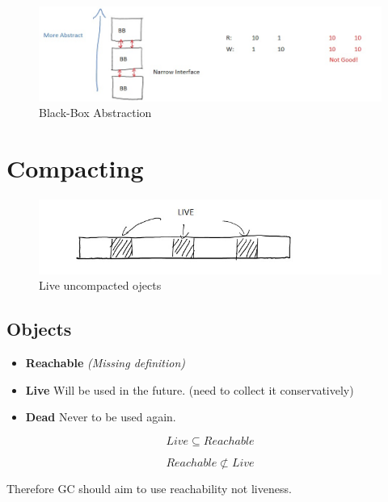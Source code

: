 \documentclass[twoside]{article}
\begin{document}
\newpage

\begin{figure}[ht!]
\centering
\includegraphics[width=150mm]{BB_Abstraction.jpg}
\caption{ Black-Box Abstraction \label{BB_Abstraction}}
\end{figure}

\section{Compacting}

\begin{figure}[ht!]
\center
\includegraphics[width=150mm]{Compacting_Live.jpg}
\caption{ Live uncompacted ojects \label{compactingLive}}
\end{figure}

\subsection*{Objects}
\begin{itemize}
	\item \textbf{Reachable} \textit{(Missing definition)}
	\item \textbf{Live} Will be used in the future. (need to collect it conservatively)
	\item \textbf{Dead} Never to be used again.
\end{itemize}

\[ Live \subseteq Reachable \]

\[ Reachable \not\subset Live \]

Therefore GC should aim to use reachability not liveness.
\end{document}
